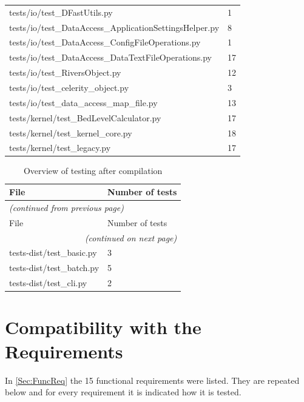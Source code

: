 \begin{longtable}{l|l}
tests/io/test\_DFastUtils.py & 1 \\
tests/io/test\_DataAccess\_ApplicationSettingsHelper.py & 8 \\
tests/io/test\_DataAccess\_ConfigFileOperations.py & 1 \\
tests/io/test\_DataAccess\_DataTextFileOperations.py & 17 \\
tests/io/test\_RiversObject.py & 12 \\
tests/io/test\_celerity\_object.py & 3 \\
tests/io/test\_data\_access\_map\_file.py & 13 \\
tests/kernel/test\_BedLevelCalculator.py & 17 \\
tests/kernel/test\_kernel\_core.py & 18 \\
tests/kernel/test\_legacy.py & 17 \\
\end{longtable}


\begin{longtable}{l|l}
\caption{Overview of testing after compilation}\label{Tab:DistRegressionTests} \\
File & Number of tests \\ \hline
\endfirsthead
\multicolumn{2}{l}{\textsl{(continued from previous page)}} \\
File & Number of tests \\ \hline
\endhead
\hline \multicolumn{2}{r}{\textsl{(continued on next page)}} \\
\endfoot
\hline
\endlastfoot

tests-dist/test\_basic.py & 3 \\
tests-dist/test\_batch.py & 5 \\
tests-dist/test\_cli.py & 2 \\
\end{longtable}

\section{Compatibility with the Requirements}

In \autoref{Sec:FuncReq} the 15 functional requirements were listed.
They are repeated below and for every requirement it is indicated how it is tested.

